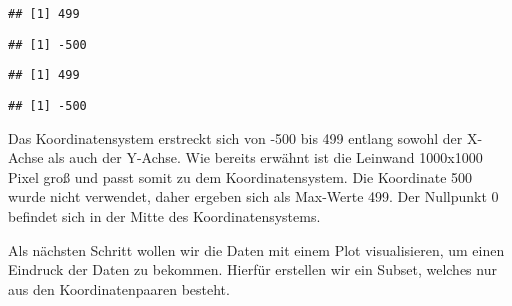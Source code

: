 \documentclass[
]{article}
\newenvironment{Shaded}{\begin{snugshade}}{\end{snugshade}}
\newcommand{\FunctionTok}[1]{\textcolor[rgb]{0.13,0.29,0.53}{\textbf{#1}}}
\newcommand{\NormalTok}[1]{#1}
\newcommand{\SpecialCharTok}[1]{\textcolor[rgb]{0.81,0.36,0.00}{\textbf{#1}}}
\begin{document}
\begin{Shaded}
\end{Shaded}

\begin{verbatim}
## [1] 499
\end{verbatim}

\begin{Shaded}
\end{Shaded}

\begin{verbatim}
## [1] -500
\end{verbatim}

\begin{Shaded}
\end{Shaded}

\begin{verbatim}
## [1] 499
\end{verbatim}

\begin{Shaded}
\end{Shaded}

\begin{verbatim}
## [1] -500
\end{verbatim}

Das Koordinatensystem erstreckt sich von -500 bis 499 entlang sowohl der
X-Achse als auch der Y-Achse. Wie bereits erwähnt ist die Leinwand
1000x1000 Pixel groß und passt somit zu dem Koordinatensystem. Die
Koordinate 500 wurde nicht verwendet, daher ergeben sich als
Max-Werte 499. Der Nullpunkt 0 befindet sich in der
Mitte des Koordinatensystems.

Als nächsten Schritt wollen wir die Daten mit einem Plot visualisieren,
um einen Eindruck der Daten zu bekommen. Hierfür erstellen wir ein
Subset, welches nur aus den Koordinatenpaaren besteht.
\end{document}
